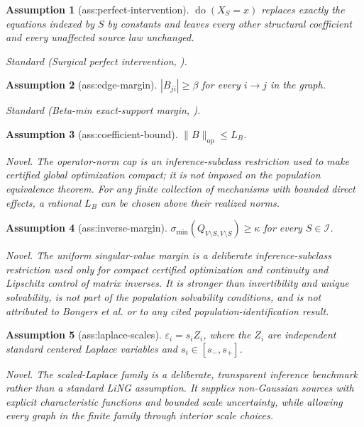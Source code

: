 \documentclass{article}
\newtheorem{assumption}{Assumption}
\begin{document}
\begin{assumption}[ass:perfect-intervention]\label{ass:perfect-intervention}
\(\operatorname{do}(X_S=x)\) replaces exactly the equations indexed by \(S\) by constants and leaves every other structural coefficient and every unaffected source law unchanged.
\par\smallskip\noindent\emph{Standard} (Surgical perfect intervention, \cite{BongersForrePetersMooij2021}).
\end{assumption}

\begin{assumption}[ass:edge-margin]\label{ass:edge-margin}
\(|B_{ji}|\ge\beta\) for every \(i\to j\) in the graph.
\par\smallskip\noindent\emph{Standard} (Beta-min exact-support margin, \cite{WangKolarDrton2026}).
\end{assumption}

\begin{assumption}[ass:coefficient-bound]\label{ass:coefficient-bound}
\(\|B\|_{\mathrm{op}}\le L_B\).
\par\smallskip\noindent\emph{Novel.} The operator-norm cap is an inference-subclass restriction used to make certified global optimization compact; it is not imposed on the population equivalence theorem. For any finite collection of mechanisms with bounded direct effects, a rational \(L_B\) can be chosen above their realized norms.
\end{assumption}

\begin{assumption}[ass:inverse-margin]\label{ass:inverse-margin}
\(\sigma_{\min}(Q_{V\setminus S,V\setminus S})\ge\kappa\) for every \(S\in\mathcal I\).
\par\smallskip\noindent\emph{Novel.} The uniform singular-value margin is a deliberate inference-subclass restriction used only for compact certified optimization and continuity and Lipschitz control of matrix inverses. It is stronger than invertibility and unique solvability, is not part of the population solvability conditions, and is not attributed to Bongers et al. or to any cited population-identification result.
\end{assumption}

\begin{assumption}[ass:laplace-scales]\label{ass:laplace-scales}
\(\varepsilon_i=s_iZ_i\), where the \(Z_i\) are independent standard centered Laplace variables and \(s_i\in[s_-,s_+]\).
\par\smallskip\noindent\emph{Novel.} The scaled-Laplace family is a deliberate, transparent inference benchmark rather than a standard LiNG assumption. It supplies non-Gaussian sources with explicit characteristic functions and bounded scale uncertainty, while allowing every graph in the finite family through interior scale choices.
\end{assumption}
\end{document}
